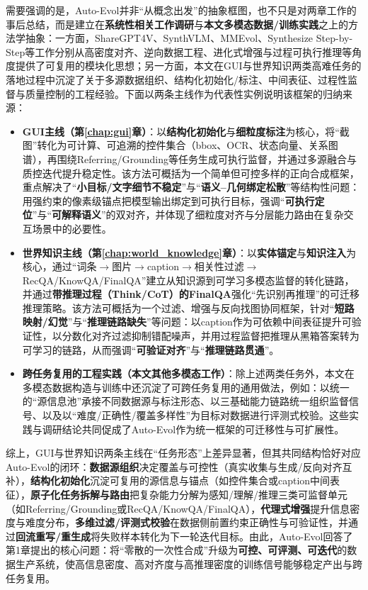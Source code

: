 需要强调的是，Auto-Evol并非“从概念出发”的抽象框图，也不只是对两章工作的事后总结，而是建立在\textbf{系统性相关工作调研}与\textbf{本文多模态数据/训练实践}之上的方法学抽象：一方面，ShareGPT4V、SynthVLM、MMEvol、Synthesize Step-by-Step等工作分别从高密度对齐、逆向数据工程、进化式增强与过程可执行推理等角度提供了可复用的模块化思想\citep{chen2023sharegpt4v,liu2025synthvlm,xu2024mmevol,li2024synthesize}；另一方面，本文在GUI与世界知识两类高难任务的落地过程中沉淀了关于多源数据组织、结构化初始化/标注、中间表征、过程性监督与质量控制的工程经验。下面以两条主线作为代表性实例说明该框架的归纳来源：
\begin{itemize}
  \item \textbf{GUI主线（第\ref{chap:gui}章）}：以\textbf{结构化初始化}与\textbf{细粒度标注}为核心，将“截图”转化为可计算、可追溯的控件集合（bbox、OCR、状态向量、关系图谱），再围绕Referring/Grounding等任务生成可执行监督，并通过多源融合与质控迭代提升稳定性。该方法可概括为一个简单但可控多样的正向合成框架，重点解决了“\textbf{小目标/文字细节不稳定}”与“\textbf{语义--几何绑定松散}”等结构性问题：用强约束的像素级锚点把模型输出绑定到可执行目标，强调“\textbf{可执行定位}”与“\textbf{可解释语义}”的双对齐，并体现了细粒度对齐与分层能力路由在复杂交互场景中的必要性。
  \item \textbf{世界知识主线（第\ref{chap:world_knowledge}章）}：以\textbf{实体锚定}与\textbf{知识注入}为核心，通过“词条$\rightarrow$图片$\rightarrow$caption$\rightarrow$相关性过滤$\rightarrow$RecQA/KnowQA/FinalQA”建立从知识源到可学习多模态监督的转化链路，并通过\textbf{带推理过程（Think/CoT）的FinalQA}强化“先识别再推理”的可迁移推理策略。该方法可概括为一个过滤、增强与反向找图协同框架，针对“\textbf{短路映射/幻觉}”与“\textbf{推理链路缺失}”等问题：以caption作为可依赖中间表征提升可验证性，以分数化对齐过滤抑制错配噪声，并用过程监督把推理从黑箱答案转为可学习的链路，从而强调“\textbf{可验证对齐}”与“\textbf{推理链路贯通}”。
  \item \textbf{跨任务复用的工程实践（本文其他多模态工作）}：除上述两类任务外，本文在多模态数据构造与训练中还沉淀了可跨任务复用的通用做法，例如：以统一的“源信息池”承接不同数据源与标注形态、以三基础能力链路统一组织监督信号、以及以“难度/正确性/覆盖多样性”为目标对数据进行评测式校验。这些实践与调研结论共同促成了Auto-Evol作为统一框架的可迁移性与可扩展性。
\end{itemize}
综上，GUI与世界知识两条主线在“任务形态”上差异显著，但其共同结构恰好对应Auto-Evol的闭环：\textbf{数据源组织}决定覆盖与可控性（真实收集与生成/反向对齐互补），\textbf{结构化初始化}沉淀可复用的源信息与锚点（如控件集合或caption中间表征），\textbf{原子化任务拆解与路由}把复杂能力分解为感知/理解/推理三类可监督单元（如Referring/Grounding或RecQA/KnowQA/FinalQA），\textbf{代理式增强}提升信息密度与难度分布，\textbf{多维过滤/评测式校验}在数据侧前置约束正确性与可验证性，并通过\textbf{回流重写/重生成}将失败样本转化为下一轮迭代目标。由此，Auto-Evol回答了第1章提出的核心问题：将“零散的一次性合成”升级为\textbf{可控、可评测、可迭代}的数据生产系统，使高信息密度、高对齐度与高推理密度的训练信号能够稳定产出与跨任务复用。

